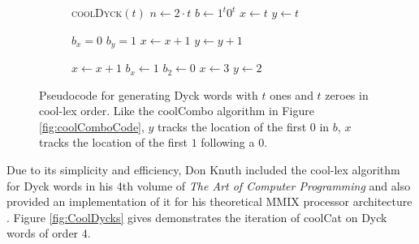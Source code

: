 \begin{figure}[H]
    \centering
    \begin{subfigure}[t]{0.3\textwidth}
        \centering
        \begin{algorithm}[H]
        \begin{algorithmic}
        \State \textsc{coolDyck}$(t)$
        \State $n \gets 2 \cdot t$
        \State $b \gets 1^t 0^t$
        \State $x \gets t$
        \State $y \gets t$
        \State {}
        
            \State $b_x=0$
            \State $b_y=1$
            \State $x \gets x+1$
            \State $y \gets y+1$
            
                \State $x \gets x+1$
                \Else
                \State $b_x \gets 1$     
                \State $b_2 \gets 0$     
                \State $x \gets 3$
                \State $y \gets 2$
                \EndIf
            \EndIf
            
            \State {}
        \EndWhile
        \end{algorithmic}
        \end{algorithm}
    \end{subfigure}
    \cprotect\caption[Pseudocode for generating Dyck words with $t$ ones and $t$ zeroes in cool-lex order.]{Pseudocode for generating Dyck words with $t$ ones and $t$ zeroes in cool-lex order. Like the coolCombo algorithm in Figure \ref{fig:coolComboCode}, $y$ tracks the location of the first $0$ in $b$, $x$ tracks the location of the first $1$ following a $0$.}
     \label{fig:coolDyckCode}
\end{figure}

Due to its simplicity and efficiency, Don Knuth included the cool-lex algorithm for Dyck words in his 4th volume of \emph{The Art of Computer Programming} and also provided an implementation of it for his theoretical MMIX processor architecture \cite{knuth2015art}. Figure \ref{fig:CoolDycks} gives demonstrates the iteration of coolCat on Dyck words of order $4$.

